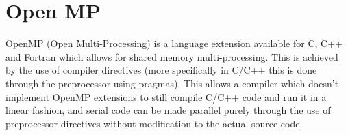 \section{Open MP}

OpenMP (Open Multi-Processing) is a language extension available for C, C++ and Fortran which allows for shared memory multi-processing. 
This is achieved by the use of compiler directives (more specifically in C/C++ this is done through the preprocessor using pragmas). 
This allows a compiler which doesn't implement OpenMP extensions to still compile C/C++ code
and run it in a linear fashion, and serial code can be made parallel purely through the use of preprocessor
directives without modification to the actual source code.  
